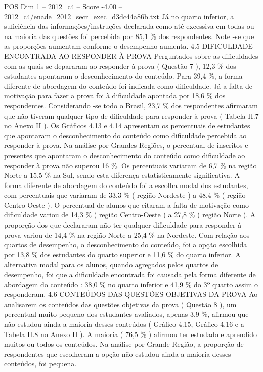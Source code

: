 \begin{textsample}{POS Dim 1 – 2012\_c4 – Score -4.00 – 2012\_c4/enade\_2012\_secr\_exec\_d3dc44a86b.txt}
Já no quarto inferior, a suficiência das informações/instruções declarada como até excessiva em todas ou na maioria das questões foi percebida por 85,1 \% dos respondentes.
Note -se que as proporções aumentam conforme o desempenho aumenta. 4.5 DIFICULDADE ENCONTRADA AO RESPONDER À PROVA Perguntados sobre as dificuldades com as quais se depararam ao responder à prova ( Questão 7 ), 12,3 \% dos estudantes apontaram o desconhecimento do conteúdo.
Para 39,4 \%, a forma diferente de abordagem do conteúdo foi indicada como dificuldade.
Já a falta de motivação para fazer a prova foi à dificuldade apontada por 18,6 \% dos respondentes.
Considerando -se todo o Brasil, 23,7 \% dos respondentes afirmaram que não tiveram qualquer tipo de dificuldade para responder à prova ( Tabela II.7 no Anexo II ).
Os Gráficos 4.13 e 4.14 apresentam os percentuais de estudantes que apontaram o desconhecimento do conteúdo como dificuldade percebida ao responder à prova.
Na análise por Grandes Regiões, o percentual de inscritos e presentes que apontaram o desconhecimento do conteúdo como dificuldade ao responder à prova não superou 16 \%.
Os percentuais variaram de 6,7 \% na região Norte a 15,5 \% na Sul, sendo esta diferença estatisticamente significativa.
A forma diferente de abordagem do conteúdo foi a escolha modal dos estudantes, com percentuais que variaram de 33,3 \% ( região Nordeste ) a 48,4 \% ( região Centro-Oeste ).
O percentual de alunos que citaram a falta de motivação como dificuldade variou de 14,3 \% ( região Centro-Oeste ) a 27,8 \% ( região Norte ).
A proporção dos que declararam não ter qualquer dificuldade para responder à prova variou de 14,4 \% na região Norte a 25,4 \% na Nordeste.
Com relação aos quartos de desempenho, o desconhecimento do conteúdo, foi a opção escolhida por 13,8 \% dos estudantes do quarto superior e 11,6 \% do quarto inferior.
A alternativa modal para os alunos, quando agregados pelos quartos de desempenho, foi que a dificuldade encontrada foi causada pela forma diferente de abordagem do conteúdo : 38,0 \% no quarto inferior e 41,9 \% do 3º quarto assim o responderam. 4.6 CONTEÚDOS DAS QUESTÕES OBJETIVAS DA PROVA Ao analisarem os conteúdos das questões objetivas da prova ( Questão 8 ), um percentual muito pequeno dos estudantes avaliados, apenas 3,9 \%, afirmou que não estudou ainda a maioria desses conteúdos ( Gráfico 4.15, Gráfico 4.16 e a Tabela II.8 no Anexo II ).
A maioria ( 76,5 \% ) afirmou ter estudado e aprendido muitos ou todos os conteúdos.
Na análise por Grande Região, a proporção de respondentes que escolheram a opção não estudou ainda a maioria desses conteúdos, foi pequena.

\end{textsample}
